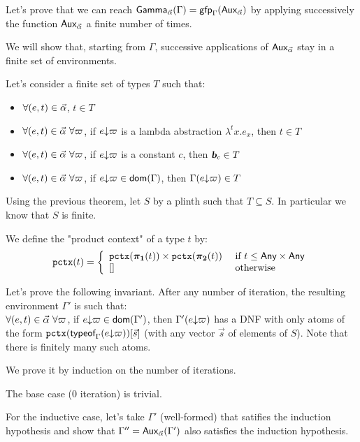 \documentclass[a4paper]{article}
\theoremstyle{definition}
\begin{document}
    Let's prove that we can reach $\textsf{Gamma}_{\vec \alpha}(\Gamma)=\textsf{gfp}_\Gamma (\textsf{Aux}_{\vec \alpha})$ by applying successively the function $\textsf{Aux}_{\vec \alpha}$ a finite number of times.

    We will show that, starting from $\Gamma$, successive applications of $\textsf{Aux}_{\vec \alpha}$ stay in a finite set of environments.

    Let's consider a finite set of types $T$ such that:
    \begin{itemize}
      \item $\forall (e,t) \in \vec \alpha$, $t \in T$
      \item $\forall (e,t) \in \vec \alpha\ \forall \varpi$, if $e{\downarrow}\varpi$ is a lambda abstraction $\lambda^tx.e_x$, then $t \in T$
      \item $\forall (e,t) \in \vec \alpha\ \forall \varpi$, if $e{\downarrow}\varpi$ is a constant $c$, then $\basic{c} \in T$
      \item $\forall (e,t) \in \vec \alpha\ \forall \varpi$, if $e{\downarrow}\varpi \in \textsf{dom}(\Gamma)$, then $\Gamma(e{\downarrow}\varpi) \in T$
    \end{itemize}

    Using the previous theorem, let $S$ by a plinth such that $T \subseteq S$. In particular we know that $S$ is finite.

    We define the "product context" of a type $t$ by:
    \[
      \texttt{pctx}(t)=\left\{
        \begin{array}{ll}
          \texttt{pctx}(\boldsymbol{\pi}_{\boldsymbol 1}(t))\times \texttt{pctx}(\boldsymbol{\pi}_{\boldsymbol 2}(t)) & \text{ if } t \leq \textsf{Any}\times \textsf{Any}\\
          {[}] & \text{ otherwise}
        \end{array}  
      \right.
    \]

    Let's prove the following invariant. After any number of iteration, the resulting environment $\Gamma'$ is such that:\\
    $\forall (e,t) \in \vec \alpha\ \forall \varpi$, if $e{\downarrow}\varpi \in \textsf{dom}(\Gamma')$, then $\Gamma'(e{\downarrow}\varpi)$ has a DNF with only atoms of the form
    $\texttt{pctx}(\textsf{typeof}_{\Gamma}(e{\downarrow}\varpi))[\vec s]$ (with any vector $\vec s$ of elements of $S$).
    Note that there is finitely many such atoms.
    
    We prove it by induction on the number of iterations.

    The base case (0 iteration) is trivial.

    For the inductive case, let's take $\Gamma'$ (well-formed) that satifies the induction hypothesis
    and show that $\Gamma'' = \textsf{Aux}_{\vec \alpha}(\Gamma')$ also satisfies the induction hypothesis.
\end{document}
